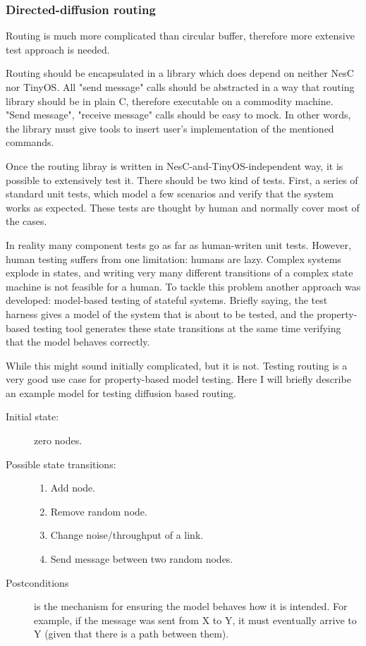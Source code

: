 \documentclass[english,11pt]{article}
\numberwithin{equation}{section}
\begin{document}
\subsubsection{Directed-diffusion routing}

Routing is much more complicated than circular buffer, therefore more extensive
test approach is needed.

Routing should be encapsulated in a library which does depend on neither NesC
nor TinyOS. All "send message" calls should be abstracted in a way that routing
library should be in plain C, therefore executable on a commodity machine.
"Send message", "receive message" calls should be easy to mock. In other words,
the library must give tools to insert user's implementation of the mentioned
commands.

Once the routing libray is written in NesC-and-TinyOS-independent way, it is
possible to extensively test it. There should be two kind of tests. First, a
series of standard unit tests, which model a few scenarios and verify that the
system works as expected. These tests are thought by human and normally cover
most of the cases.

In reality many component tests go as far as human-writen unit tests. However,
human testing suffers from one limitation: humans are lazy. Complex systems
explode in states, and writing very many different transitions of a complex
state machine is not feasible for a human. To tackle this problem another
approach was developed: model-based testing of stateful
systems\cite{model-testing}. Briefly saying, the test harness gives a model of
the system that is about to be tested, and the property-based testing tool
generates these state transitions at the same time verifying that the model
behaves correctly.

While this might sound initially complicated, but it is not. Testing routing is
a very good use case for property-based model testing. Here I will briefly
describe an example model for testing diffusion based routing.

\begin{description}
    \item[Initial state:] zero nodes.
    \item[Possible state transitions:]
        \begin{enumerate}
            \item Add node.
            \item Remove random node.
            \item Change noise/throughput of a link.
            \item Send message between two random nodes.
        \end{enumerate}
    \item[Postconditions] is the mechanism for ensuring the model behaves how it
        is intended. For example, if the message was sent from X to Y, it must
        eventually arrive to Y (given that there is a path between them).
\end{description}
\end{document}
